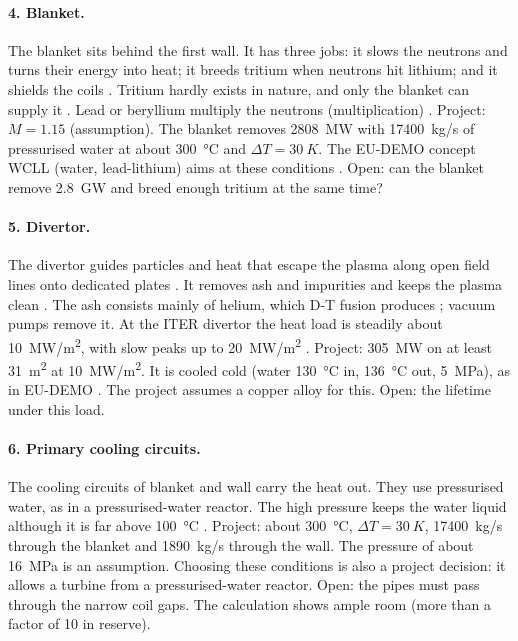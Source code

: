 \paragraph{4. Blanket.} The blanket sits behind the first wall. It has three jobs: it slows the neutrons and turns their energy into heat; it breeds tritium when neutrons hit lithium; and it shields the coils \cite{bt_breeding,bt_iter_blanket}. Tritium hardly exists in nature, and only the blanket can supply it \cite{bt_breeding}. Lead or beryllium multiply the neutrons (multiplication) \cite{bt_breeding}. Project: $M = 1.15$ (assumption). The blanket removes \SI{2808}{MW} with \SI{17400}{kg/s} of pressurised water at about \SI{300}{\celsius} and $\Delta T = \SI{30}{K}$. The EU-DEMO concept WCLL (water, lead-lithium) aims at these conditions \cite{arena2023}. Open: can the blanket remove \SI{2.8}{GW} and breed enough tritium at the same time?

\paragraph{5. Divertor.} The divertor guides particles and heat that escape the plasma along open field lines onto dedicated plates \cite{bt_divertor}. It removes ash and impurities and keeps the plasma clean \cite{bt_iter_divertor}. The ash consists mainly of helium, which D-T fusion produces \cite{bt_dtfusion}; vacuum pumps remove it. At the ITER divertor the heat load is steadily about \SI{10}{MW/m^2}, with slow peaks up to \SI{20}{MW/m^2} \cite{bt_iter_divertor}. Project: \SI{305}{MW} on at least \SI{31}{m^2} at \SI{10}{MW/m^2}. It is cooled cold (water \SI{130}{\celsius} in, \SI{136}{\celsius} out, \SI{5}{MPa}), as in EU-DEMO \cite{you2022}. The project assumes a copper alloy for this. Open: the lifetime under this load.

\paragraph{6. Primary cooling circuits.} The cooling circuits of blanket and wall carry the heat out. They use pressurised water, as in a pressurised-water reactor. The high pressure keeps the water liquid although it is far above \SI{100}{\celsius} \cite{bt_pwr}. Project: about \SI{300}{\celsius}, $\Delta T = \SI{30}{K}$, \SI{17400}{kg/s} through the blanket and \SI{1890}{kg/s} through the wall. The pressure of about \SI{16}{MPa} is an assumption. Choosing these conditions is also a project decision: it allows a turbine from a pressurised-water reactor. Open: the pipes must pass through the narrow coil gaps. The calculation shows ample room (more than a factor of 10 in reserve).

